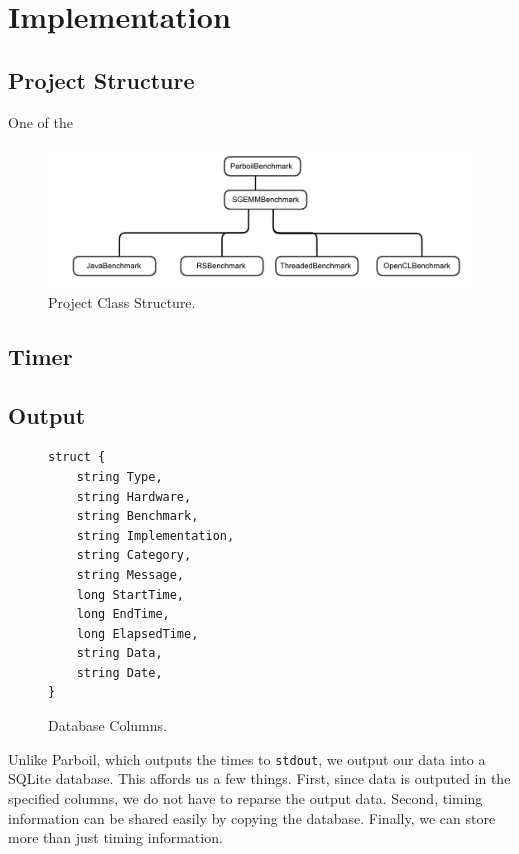 
\section{Implementation}

\subsection{Project Structure}

One of the 


\begin{figure}[t!]
\includegraphics[scale=0.43, angle=90]{class_arch.pdf}
\caption{Project Class Structure.}
\label{fig:projclass}
\centering
\end{figure}


\subsection{Timer}



\subsection{Output}


\begin{figure}[t!]
\begin{verbatim}
struct {
	string Type,
	string Hardware,
	string Benchmark,
	string Implementation,
	string Category,
	string Message,
	long StartTime,
	long EndTime,
	long ElapsedTime,
	string Data,
	string Date,
}
\end{verbatim}
\caption{Database Columns.}
\label{fig:database}
\centering
\end{figure}

Unlike Parboil, which outputs the times to {\tt stdout}, we output our data into a SQLite database.
This affords us a few things.
First, since data is outputed in the specified columns, we do not have to reparse the output data.
Second, timing information can be shared easily by copying the database.
Finally, we can store more than just timing information.

